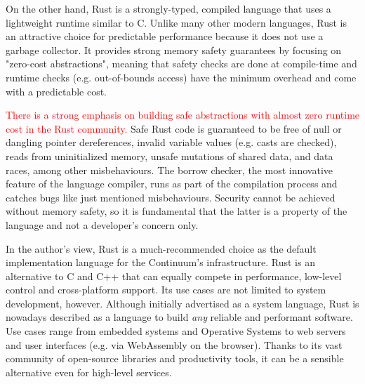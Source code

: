 On the other hand, Rust is a strongly-typed, compiled language that uses a lightweight runtime similar to C. Unlike many other modern languages, Rust is an attractive choice for predictable performance because it does not use a garbage collector. It provides strong memory safety guarantees by focusing on "zero-cost abstractions", meaning that safety checks are done at compile-time and runtime checks (e.g. out-of-bounds access) have the minimum overhead and come with a predictable cost.


\textcolor{red}{There is a strong emphasis on building safe abstractions with almost zero runtime cost in the Rust community.} Safe Rust code is guaranteed to be free of null or dangling pointer dereferences, invalid variable values (e.g. casts are checked), reads from uninitialized memory, unsafe mutations of shared data, and data races, among other misbehaviours.  The borrow checker, the most innovative feature of the language compiler, runs as part of the compilation process and catches bugs like just mentioned misbehaviours. Security cannot be achieved without memory safety, so it is fundamental that the latter is a property of the language and not a developer's concern only.

In the author's view, Rust is a much-recommended choice as the default implementation language for the Continuum's infrastructure. Rust is an alternative to C and C++ that can equally compete in performance, low-level control and cross-platform support. Its use cases are not limited to system development, however. Although initially advertised as a system language, Rust is nowadays described as a language to build \emph{any} reliable and performant software. Use cases range from embedded systems and Operative Systems to web servers and user interfaces (e.g. via WebAssembly on the browser). Thanks to its vast community of open-source libraries and productivity tools, it can be a sensible alternative even for high-level services.

